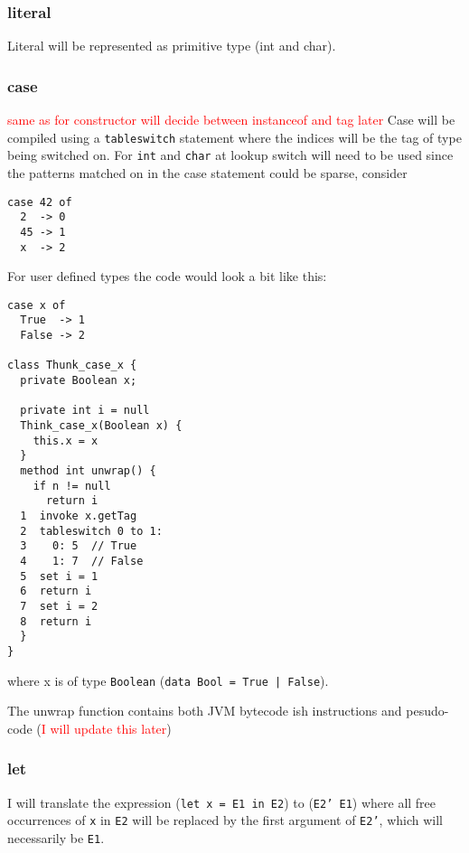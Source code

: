 \documentclass[12pt,a4paper,twoside]{article}
\begin{document}
\subsubsection{literal}

Literal will be represented as primitive type (int and char).

\subsubsection{case}

\textcolor{red}{same as for constructor will decide between instanceof and tag later}
Case will be compiled using a \texttt{tableswitch} statement where the indices will be the tag of type being switched on. For \texttt{int} and \texttt{char} at lookup 
switch will need to be used since the patterns matched on in the case statement could be sparse, consider

\begin{verbatim}
case 42 of
  2  -> 0
  45 -> 1
  x  -> 2
\end{verbatim}

For user defined types the code would look a bit like this:

\begin{verbatim}
case x of
  True  -> 1
  False -> 2

class Thunk_case_x {
  private Boolean x;

  private int i = null
  Think_case_x(Boolean x) {
    this.x = x
  }
  method int unwrap() {
    if n != null
      return i
  1  invoke x.getTag
  2  tableswitch 0 to 1:
  3    0: 5  // True
  4    1: 7  // False
  5  set i = 1
  6  return i
  7  set i = 2
  8  return i
  }
}
\end{verbatim}

where x is of type \texttt{Boolean} (\texttt{data Bool = True | False}).

The unwrap function contains both JVM bytecode ish instructions and pesudo-code (\textcolor{red}{I will update this later})

\subsubsection{let} 

I will translate the expression (\texttt{let x = E1 in E2}) to (\texttt{E2' E1}) where all 
free occurrences of \texttt{x} in \texttt{E2} will be replaced by the first argument of 
\texttt{E2'}, which will necessarily be \texttt{E1}.
\end{document}
